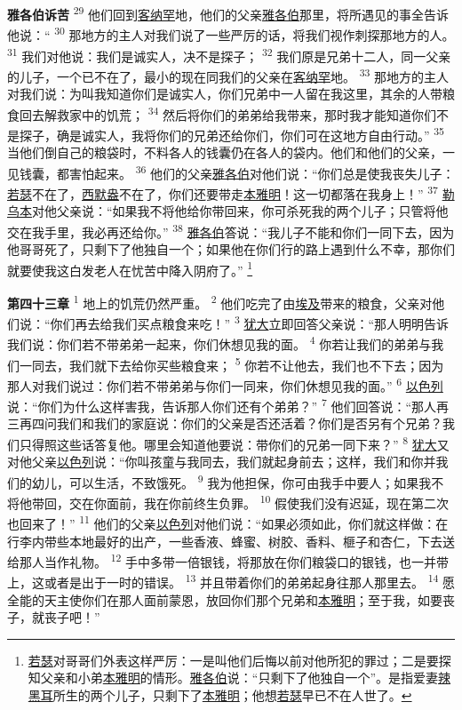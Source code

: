 \textbf{雅各伯诉苦\quad}
\textsuperscript{29}
他们回到\uline{客纳罕}地，他们的父亲\uline{雅各伯}那里，将所遇见的事全告诉他说：“
\textsuperscript{30}
那地方的主人对我们说了一些严厉的话，将我们视作刺探那地方的人。
\textsuperscript{31}
我们对他说：我们是诚实人，决不是探子；
\textsuperscript{32}
我们原是兄弟十二人，同一父亲的儿子，一个已不在了，最小的现在同我们的父亲在\uline{客纳罕}地。
\textsuperscript{33}
那地方的主人对我们说：为叫我知道你们是诚实人，你们兄弟中一人留在我这里，其余的人带粮食回去解救家中的饥荒；
\textsuperscript{34}
然后将你们的弟弟给我带来，那时我才能知道你们不是探子，确是诚实人，我将你们的兄弟还给你们，你们可在这地方自由行动。”
\textsuperscript{35}
当他们倒自己的粮袋时，不料各人的钱囊仍在各人的袋内。他们和他们的父亲，一见钱囊，都害怕起来。
\textsuperscript{36}
他们的父亲\uline{雅各伯}对他们说：“你们总是使我丧失儿子：\uline{若瑟}不在了，\uline{西默盎}不在了，你们还要带走\uline{本雅明}！这一切都落在我身上！”
\textsuperscript{37}
\uline{勒乌本}对他父亲说：“如果我不将他给你带回来，你可杀死我的两个儿子；只管将他交在我手里，我必再还给你。”
\textsuperscript{38}
\uline{雅各伯}答说：“我儿子不能和你们一同下去，因为他哥哥死了，只剩下了他独自一个；如果他在你们行的路上遇到什么不幸，那你们就要使我这白发老人在忧苦中降入阴府了。”
\footnote{\uline{若瑟}对哥哥们外表这样严厉：一是叫他们后悔以前对他所犯的罪过；二是要探知父亲和小弟\uline{本雅明}的情形。\uline{雅各伯}说：“只剩下了他独自一个”。是指爱妻\uline{辣黑耳}所生的两个儿子，只剩下了\uline{本雅明}；他想\uline{若瑟}早已不在人世了。}

\textbf{第四十三章\quad}
\textsuperscript{1}
地上的饥荒仍然严重。
\textsuperscript{2}
他们吃完了由\uline{埃及}带来的粮食，父亲对他们说：“你们再去给我们买点粮食来吃！”
\textsuperscript{3}
\uline{犹大}立即回答父亲说：“那人明明告诉我们说：你们若不带弟弟一起来，你们休想见我的面。
\textsuperscript{4}
你若让我们的弟弟与我们一同去，我们就下去给你买些粮食来；
\textsuperscript{5}
你若不让他去，我们也不下去；因为那人对我们说过：你们若不带弟弟与你们一同来，你们休想见我的面。”
\textsuperscript{6}
\uline{以色列}说：“你们为什么这样害我，告诉那人你们还有个弟弟？”
\textsuperscript{7}
他们回答说：“那人再三再四问我们和我们的家庭说：你们的父亲是否还活着？你们是否另有个兄弟？我们只得照这些话答复他。哪里会知道他要说：带你们的兄弟一同下来？”
\textsuperscript{8}
\uline{犹大}又对他父亲\uline{以色列}说：“你叫孩童与我同去，我们就起身前去；这样，我们和你并我们的幼儿，可以生活，不致饿死。
\textsuperscript{9}
我为他担保，你可由我手中要人；如果我不将他带回，交在你面前，我在你前终生负罪。
\textsuperscript{10}
假使我们没有迟延，现在第二次也回来了！”
\textsuperscript{11}
他们的父亲\uline{以色列}对他们说：“如果必须如此，你们就这样做：在行李内带些本地最好的出产，一些香液、蜂蜜、树胶、香料、榧子和杏仁，下去送给那人当作礼物。
\textsuperscript{12}
手中多带一倍银钱，将那放在你们粮袋口的银钱，也一并带上，这或者是出于一时的错误。
\textsuperscript{13}
并且带着你们的弟弟起身往那人那里去。
\textsuperscript{14}
愿全能的天主使你们在那人面前蒙恩，放回你们那个兄弟和\uline{本雅明}；至于我，如要丧子，就丧子吧！”

